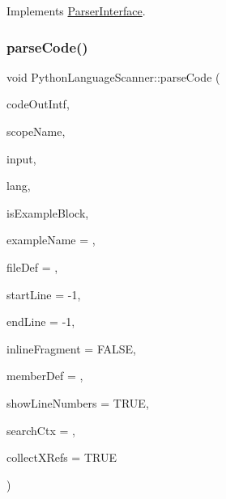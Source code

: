 Implements \mbox{\hyperlink{class_parser_interface_a36c669b17b64a6e3847f27d70a5398d2}{Parser\+Interface}}.

\mbox{\label{class_python_language_scanner_a0920a8f0a1fc295f0e9c240aee99012c}} 
\subsubsection{\texorpdfstring{parseCode()}{parseCode()}}
{\footnotesize\ttfamily void Python\+Language\+Scanner\+::parse\+Code (\begin{DoxyParamCaption}\item[{\mbox{\hyperlink{class_code_output_interface}{Code\+Output\+Interface}} \&}]{code\+Out\+Intf,  }\item[{const char $\ast$}]{scope\+Name,  }\item[{const \mbox{\hyperlink{class_q_c_string}{Q\+C\+String}} \&}]{input,  }\item[{\mbox{\hyperlink{types_8h_a9974623ce72fc23df5d64426b9178bf2}{Src\+Lang\+Ext}}}]{lang,  }\item[{bool}]{is\+Example\+Block,  }\item[{const char $\ast$}]{example\+Name = {},  }\item[{\mbox{\hyperlink{class_file_def}{File\+Def}} $\ast$}]{file\+Def = {},  }\item[{int}]{start\+Line = {\ttfamily -\/1},  }\item[{int}]{end\+Line = {\ttfamily -\/1},  }\item[{bool}]{inline\+Fragment = {\ttfamily FALSE},  }\item[{\mbox{\hyperlink{class_member_def}{Member\+Def}} $\ast$}]{member\+Def = {},  }\item[{bool}]{show\+Line\+Numbers = {\ttfamily TRUE},  }\item[{\mbox{\hyperlink{class_definition}{Definition}} $\ast$}]{search\+Ctx = {},  }\item[{bool}]{collect\+X\+Refs = {\ttfamily TRUE} }\end{DoxyParamCaption})\hspace{0.3cm}{\ttfamily [virtual]}}

